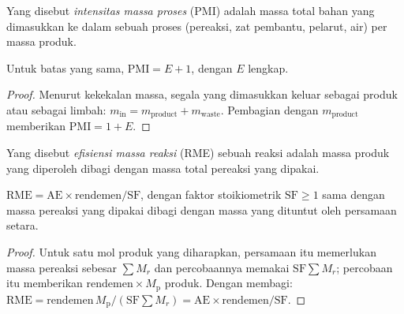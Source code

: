 \begin{definition}\label{def:b3:green-industrial:pmi}
Yang disebut \emph{intensitas massa proses} (PMI) adalah
massa total bahan yang dimasukkan ke dalam sebuah proses (pereaksi, zat pembantu, pelarut,
air) per massa produk.
\end{definition}

\begin{proposition}\label{prop:b3:green-industrial:pmi-e}
Untuk batas yang sama, $\mathrm{PMI} = E + 1$, dengan $E$  lengkap.
\end{proposition}

\begin{proof}
Menurut kekekalan massa, segala yang dimasukkan keluar sebagai produk atau sebagai limbah:
$m_{\mathrm{in}} = m_{\mathrm{product}} + m_{\mathrm{waste}}$. Pembagian dengan $m_{\mathrm{product}}$ memberikan $\mathrm{PMI} = 1 + E$.
\end{proof}

\begin{definition}\label{def:b3:green-industrial:rme}
Yang disebut \emph{efisiensi massa reaksi} (RME) sebuah
reaksi adalah massa produk yang diperoleh dibagi dengan massa total
pereaksi yang dipakai.
\end{definition}

\begin{proposition}\label{prop:b3:green-industrial:rme}
$\mathrm{RME} = \mathrm{AE} \times \text{rendemen}/\mathrm{SF}$, dengan faktor stoikiometrik $\mathrm{SF} \ge 1$ sama dengan massa
pereaksi yang dipakai dibagi dengan massa yang dituntut oleh persamaan setara.
\end{proposition}

\begin{proof}
Untuk satu mol produk yang diharapkan, persamaan itu memerlukan massa pereaksi sebesar $\sum M_r$ dan
percobaannya memakai $\mathrm{SF}\sum M_r$; percobaan itu memberikan $\text{rendemen} \times M_{\mathrm p}$ produk. Dengan membagi:
$\mathrm{RME} = \text{rendemen}\,M_{\mathrm p}/(\mathrm{SF}\sum M_r) = \mathrm{AE} \times \text{rendemen}/\mathrm{SF}$.
\end{proof}

